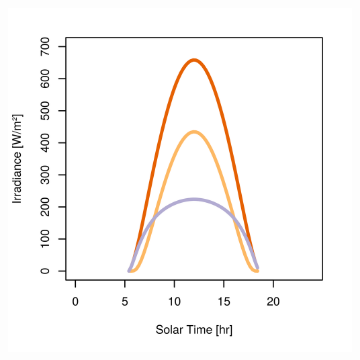 \begin{figure}[h]
\captionsetup[subfigure]{justification=centering}
\vspace{-2ex}
	\centering
    \setlength{\subfigureWidth}{0.50\textwidth}
    \setlength{\graphicsHeight}{80mm}
    \hypersetup{hidelinks=true}%
  	\begin{subfigure}[t]{\subfigureWidth}
      \centering
  		\includegraphics[height=\graphicsHeight]{sections/martian-environment/plots/gh-gbh-gdh-variation-1-for-ls-248-phi-20-tau-05-and-albedo-027.png}
  		\label{fig:sub:irradiance-phi-m20}
  	\end{subfigure}\hfill
    \begin{subfigure}[t]{\subfigureWidth}
      \centering

\end{subfigure}
\end{figure}
